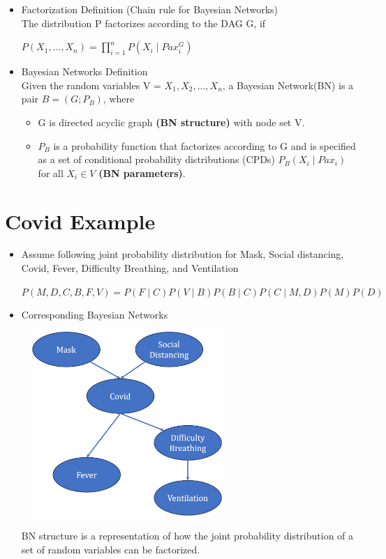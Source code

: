 \documentclass[11pt,a4paper]{report}
\begin{document}
\begin{itemize}
    \item Factorization Definition (Chain rule for Bayesian Networks)\\
    The distribution P factorizes according to the DAG G, if
    \begin{center}
        $P(X_{1}, \ldots, X_{n}) = \prod_{i=1}^{n}P(X_{i} \mid Pax_{i}^{G})$
    \end{center}
    \item Bayesian Networks Definition \\
    Given the random variables V = ${X_{1}, X_{2}, \ldots, X_{n}}$, a Bayesian Network(BN) is a pair $B = (G; P_{B})$, where
    \begin{itemize}
        \item G is directed acyclic graph \textbf{(BN structure)} with node set V.
        \item $P_{B}$ is a probability function that factorizes according to G and is specified as a set of conditional probability distributions (CPDs) $P_{B}(X_{i} \mid Pax_{i})$ for all $X_{i} \in V$ \textbf{(BN parameters)}.
    \end{itemize}
\end{itemize}

\section{Covid Example}

\begin{itemize}
    \item Assume following joint probability distribution for Mask, Social distancing, Covid, Fever, Difficulty Breathing, and Ventilation
    \begin{center}
        $P(M,D,C,B,F,V) = P(F \mid C)P(V \mid B)P(B \mid C)P(C \mid M,D)P(M)P(D)$
    \end{center}
    \item Corresponding Bayesian Networks
    \begin{center}
        \includegraphics[width = 8cm, height = 7cm]{covid_graph.png}
    \end{center}
    BN structure is a representation of how the joint probability distribution of a set of random variables can be factorized.
\end{itemize}
\end{document}
